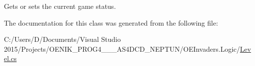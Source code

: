 Gets or sets the current game status. 



The documentation for this class was generated from the following file\+:\begin{DoxyCompactItemize}
\item 
C\+:/\+Users/\+D/\+Documents/\+Visual Studio 2015/\+Projects/\+O\+E\+N\+I\+K\+\_\+\+P\+R\+O\+G4\+\_\+\_\+\_\+\+A\+S4\+D\+C\+D\+\_\+\+N\+E\+P\+T\+U\+N/\+O\+E\+Invaders.\+Logic/\mbox{\hyperlink{_level_8cs}{Level.\+cs}}\end{DoxyCompactItemize}
